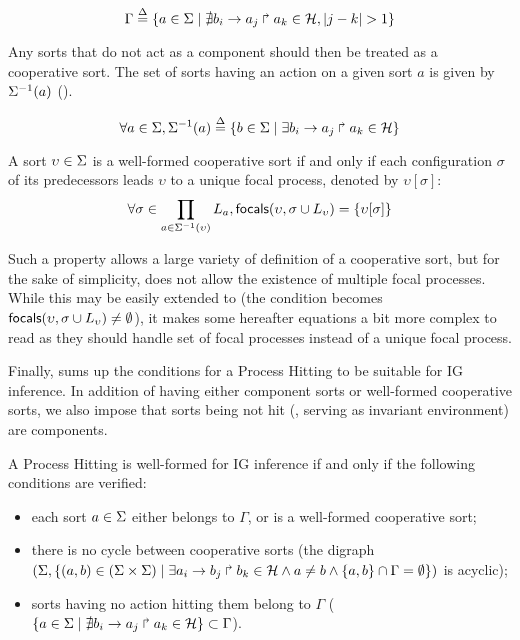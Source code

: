 \begin{equation}
\Gamma \stackrel{\Delta}= \{a \in \Sigma \mid \nexists b_i\rightarrow a_j\Rsh a_k \in \mathcal{H}, |j - k| > 1\} \\
\label{eq:PH-components}
\end{equation}

Any sorts that do not act as a component should then be treated as a cooperative sort.
The set of sorts having an action on a given sort $a$ is given by 
$\Sigma^{-1}(a)$ ().

\begin{equation}
\forall a \in \Sigma, \Sigma^{-1}(a) \stackrel{\Delta}= \{b \in \Sigma \mid \exists b_i\rightarrow a_j\Rsh a_k\in\mathcal{H} \}
\label{eq:ph_direct_predec}
\end{equation}

\begin{property}\label{pro:wf-cooperative-sort}
A sort $\upsilon\in\Sigma$ is a well-formed cooperative sort if and only if
each configuration $\sigma$ of its predecessors leads $\upsilon$ to a unique focal process,
denoted by $\upsilon[\sigma]$:
\[
\forall \sigma \in \prod_{a\in\Sigma^{-1}(\upsilon)} L_{a},
\mathsf{focals}(\upsilon,\sigma\cup L_\upsilon) = \{ \upsilon[\sigma] \}\]
\end{property}

Such a property allows a large variety of definition of a cooperative sort, but
for the sake of simplicity, does not allow the existence of multiple focal processes.
While this may be easily extended to (the condition becomes 
$\mathsf{focals}(\upsilon,\sigma\cup L_\upsilon)\neq\emptyset$), it makes some hereafter equations a bit
more complex to read as they should handle set of focal processes instead of a unique focal process.


Finally,  sums up the conditions for a Process Hitting to be suitable for IG
inference.
In addition of having either component sorts or well-formed cooperative sorts, we also impose that
sorts being not hit (\ie{}, serving as invariant environment) are components.

\begin{property}\label{pro:wf-ph}
A Process Hitting is well-formed for IG inference if and only if the following conditions are
verified:
\begin{itemize}
\item 
each sort $a\in\Sigma$ either belongs to $\Gamma$, or is a well-formed cooperative sort;
\item 
there is no cycle between cooperative sorts
(the digraph $(\Sigma,\{(a,b)\in(\Sigma\times\Sigma)\mid \exists a_i\rightarrow b_j\Rsh b_k\in\mathcal{H}
\wedge a\neq b\wedge \{a,b\}\cap\Gamma=\emptyset \})$ is
acyclic);
\item 
sorts having no action hitting them belong to $\Gamma$
($\{ a \in \Sigma\mid \nexists b_i\rightarrow a_j\Rsh a_k\in\mathcal{H}\} \subset \Gamma$).
\end{itemize}
\end{property}

